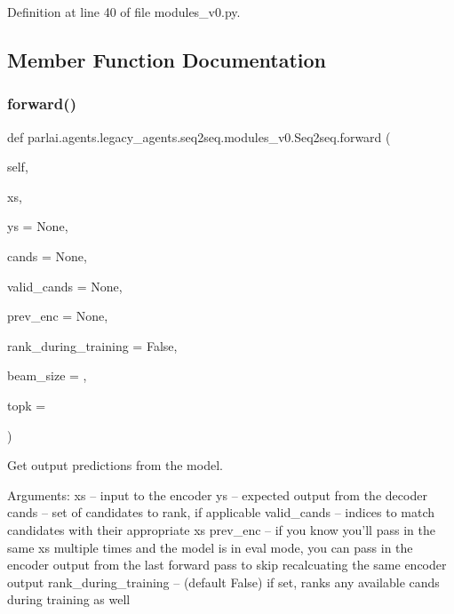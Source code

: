 Definition at line 40 of file modules\+\_\+v0.\+py.



\subsection{Member Function Documentation}
\mbox{\label{classparlai_1_1agents_1_1legacy__agents_1_1seq2seq_1_1modules__v0_1_1Seq2seq_a5c8f9eaa59a088164f0e23de5ca37c67}} 
\subsubsection{\texorpdfstring{forward()}{forward()}}
{\footnotesize\ttfamily def parlai.\+agents.\+legacy\+\_\+agents.\+seq2seq.\+modules\+\_\+v0.\+Seq2seq.\+forward (\begin{DoxyParamCaption}\item[{}]{self,  }\item[{}]{xs,  }\item[{}]{ys = {\ttfamily None},  }\item[{}]{cands = {\ttfamily None},  }\item[{}]{valid\+\_\+cands = {\ttfamily None},  }\item[{}]{prev\+\_\+enc = {\ttfamily None},  }\item[{}]{rank\+\_\+during\+\_\+training = {\ttfamily False},  }\item[{}]{beam\+\_\+size = {},  }\item[{}]{topk = {} }\end{DoxyParamCaption})}

\begin{DoxyVerb}Get output predictions from the model.

Arguments:
xs -- input to the encoder
ys -- expected output from the decoder
cands -- set of candidates to rank, if applicable
valid_cands -- indices to match candidates with their appropriate xs
prev_enc -- if you know you'll pass in the same xs multiple times and
    the model is in eval mode, you can pass in the encoder output from
    the last forward pass to skip recalcuating the same encoder output
rank_during_training -- (default False) if set, ranks any available
    cands during training as well
\end{DoxyVerb}
 

